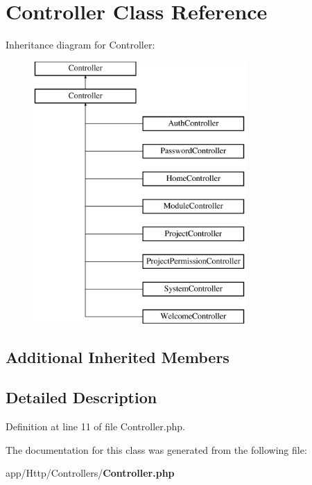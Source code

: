 \section{Controller Class Reference}
\label{class_app_1_1_http_1_1_controllers_1_1_controller}
Inheritance diagram for Controller\+:\begin{figure}[H]
\begin{center}
\leavevmode
\includegraphics[height=10.000000cm]{class_app_1_1_http_1_1_controllers_1_1_controller}
\end{center}
\end{figure}
\subsection*{Additional Inherited Members}


\subsection{Detailed Description}


Definition at line 11 of file Controller.\+php.



The documentation for this class was generated from the following file\+:\begin{DoxyCompactItemize}
\item 
app/\+Http/\+Controllers/{\bf Controller.\+php}\end{DoxyCompactItemize}
